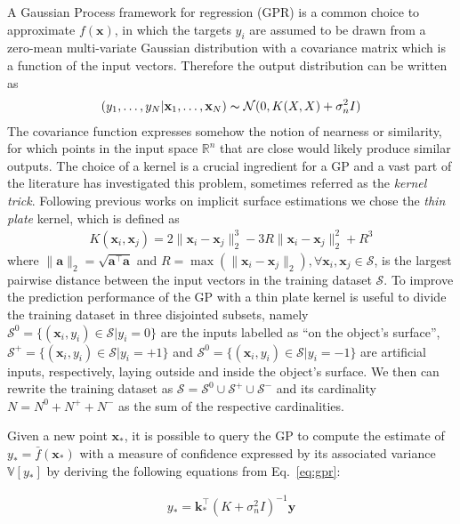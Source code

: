 A Gaussian Process framework for regression (GPR) is a common choice to approximate $f(\mathbf{x})$, in which the targets $y_i$ are assumed to be drawn from a zero-mean multi-variate Gaussian distribution with a covariance matrix which is a function of the input vectors. Therefore the output distribution can be written as
\begin{eqnarray}
\label{eq:gpr}
(y_1,\dots,y_N|\mathbf{x}_1,\dots,\mathbf{x}_N)\thicksim\mathcal{N}(0,K(X,X)+\sigma_n^2I)
\end{eqnarray}
The covariance function expresses somehow the notion of nearness or similarity, for which points in the input space $\mathbb{R}^n$ that are close would likely produce similar outputs. The choice of a kernel is a crucial ingredient for a GP and a vast part of the literature has investigated this problem, sometimes referred as the \emph{kernel trick}. Following previous works on implicit surface estimations we chose the \emph{thin plate} kernel, which is defined as
\begin{eqnarray}
\label{eq:thinplate}
K(\mathbf{x}_i,\mathbf{x}_j)=2\|\mathbf{x}_i-\mathbf{x}_j\|_2^3-3R\|\mathbf{x}_i-\mathbf{x}_j\|_2^2+R^3
\end{eqnarray}
where $\|\mathbf{a}\|_2=\sqrt{\mathbf{a}^\top\mathbf{a}}$ and $R=\max(\|\mathbf{x}_i-\mathbf{x}_j\|_2),\forall\mathbf{x}_i,\mathbf{x}_j\in\mathcal{S}$, is the largest pairwise distance between the input vectors in the training dataset $\mathcal{S}$. To improve the prediction performance of the GP with a thin plate kernel is useful to divide the training dataset in three disjointed subsets, namely $\mathcal{S}^0=\{(\mathbf{x}_i,y_i)\in\mathcal{S}|y_i=0\}$ are the inputs labelled as ``on the object's surface'', $\mathcal{S}^+=\{(\mathbf{x}_i,y_i)\in\mathcal{S}|y_i=+1\}$ and $\mathcal{S}^0=\{(\mathbf{x}_i,y_i)\in\mathcal{S}|y_i=-1\}$ are artificial inputs, respectively, laying outside and inside the object's surface. We then can rewrite the training dataset as $\mathcal{S}=\mathcal{S}^0\cup\mathcal{S}^+\cup\mathcal{S}^-$ and its cardinality $N=N^0+N^++N^-$ as the sum of the respective cardinalities.

Given a new point $\mathbf{x}_*$, it is possible to query the GP to compute the estimate of $y_*=\bar{f}(\mathbf{x}_*)$ with a measure of confidence expressed by its associated variance $\mathbb{V}[y_*]$ by deriving the following equations from Eq.~\ref{eq:gpr}:

\begin{eqnarray}
\label{eq:gpr_mu}
y_*=\mathbf{k}_*^\top(K+\sigma_n^2I)^{-1}\mathbf{y}
\end{eqnarray}

